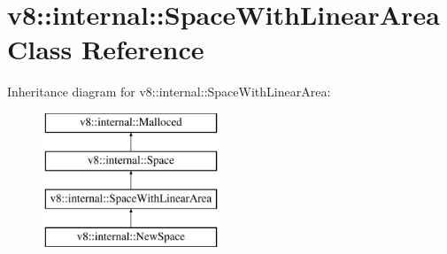 \hypertarget{classv8_1_1internal_1_1SpaceWithLinearArea}{}\section{v8\+:\+:internal\+:\+:Space\+With\+Linear\+Area Class Reference}
\label{classv8_1_1internal_1_1SpaceWithLinearArea}
Inheritance diagram for v8\+:\+:internal\+:\+:Space\+With\+Linear\+Area\+:\begin{figure}[H]
\begin{center}
\leavevmode
\includegraphics[height=4.000000cm]{classv8_1_1internal_1_1SpaceWithLinearArea}
\end{center}
\end{figure}
